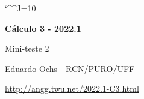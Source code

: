 \documentclass[oneside,12pt]{article}
\begin{document}
\catcode`\^^J=10
\pu
\def\pictgridstyle{\color{GrayPale}\linethickness{0.3pt}}
\def\pictaxesstyle{\linethickness{0.5pt}}
\def\pictnaxesstyle{\color{GrayPale}\linethickness{0.5pt}}
\celllower=2.5pt


\def\u#1{\par{\footnotesize \url{#1}}}

\def\Rq{\ColorRed{?}}

\def\drafturl{http://angg.twu.net/LATEX/2022-1-C3.pdf}
\def\drafturl{http://angg.twu.net/2022.1-C3.html}
\def\draftfooter{\tiny \href{\drafturl}{\jobname{}} \ColorBrown{\shorttoday{} \hours}}



%

\thispagestyle{empty}

\begin{center}

\vspace*{1.2cm}

{\bf \Large Cálculo 3 - 2022.1}

\bsk

Mini-teste 2

\bsk

Eduardo Ochs - RCN/PURO/UFF

\url{http://angg.twu.net/2022.1-C3.html}

\end{center}

\newpage

\end{document}
